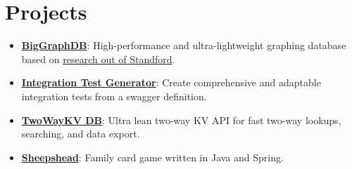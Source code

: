 \documentclass[letterpaper,11pt]{article}
\newcommand{\resumeItem}[2]{
  \item\small{
    \textbf{#1}{: #2 \vspace{-2pt}}
  }
}
\newcommand{\resumeSubItem}[2]{\resumeItem{#1}{#2}\vspace{-4pt}}
\newcommand{\resumeSubHeadingListStart}{\begin{itemize}[leftmargin=*]}
\newcommand{\resumeSubHeadingListEnd}{\end{itemize}}
\begin{document}
\section{Projects}
  \resumeSubHeadingListStart
    \resumeSubItem{\href{https://github.com/dgoldstein1/graphApi}{BigGraphDB}}
      {High-performance and ultra-lightweight graphing database based on \href{https://snap.stanford.edu}{research out of Standford}.}
    \resumeSubItem{\href{https://github.com/dgoldstein1/integration-test-generator}{Integration Test Generator}}
      {Create comprehensive and adaptable integration tests from a swagger definition.}
    \resumeSubItem{\href{https://github.com/dgoldstein1/twoWayKeyValue}{TwoWayKV DB}}
      {Ultra lean two-way KV API for fast two-way lookups, searching, and data export.}
    \resumeSubItem{\href{https://github.com/dgoldstein1/Sheepshead}{Sheepshead}}
      {Family card game written in Java and Spring.}
  \resumeSubHeadingListEnd
\end{document}
